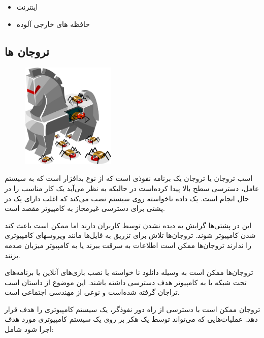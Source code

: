 \documentclass[12pt]{book}
\begin{document}
\begin{itemize}
	\item اینترنت
	\item حافظه های خارجی آلوده
\end{itemize}


\newpage

\subsection{تروجان ها}

\begin{figure}
  \vspace{-20pt}
  \begin{center}
    \includegraphics[width=0.4\textwidth]{./HiRes-923x1030.jpg}
  \end{center}
  \vspace{-20pt}
  \caption{}
  \vspace{-10pt}
\end{figure}


اسب تروجان
 یا تروجان یک برنامه نفوذی است که از نوع بدافزار است که به سیستم عامل، دسترسی سطح بالا پیدا کرده‌است در حالیکه به نظر می‌آید یک کار مناسب را در حال انجام است. یک داده ناخواسته روی سیستم نصب می‌کند که اغلب دارای یک در پشتی برای دسترسی غیرمجاز به کامپیوتر مقصد است.

این در پشتی‌ها گرایش به دیده نشدن توسط کاربران دارند اما ممکن است باعث کند شدن کامپیوتر شوند. تروجان‌ها تلاش برای تزریق به فایل‌ها مانند ویروسهای کامپیوتری را ندارند تروجان‌ها ممکن است اطلاعات به سرقت ببرند یا به کامپیوتر میزبان صدمه بزنند.

تروجان‌ها ممکن است به وسیله دانلود نا خواسته یا نصب بازی‌های آنلاین یا برنامه‌های تحت شبکه یا به کامپیوتر هدف دسترسی داشته باشند. این موضوع از داستان اسب تراجان گرفته شده‌است و نوعی از مهندسی اجتماعی است.


تروجان ممکن است با دسترسی از راه دور نفوذگر، یک سیستم کامپیوتری را هدف قرار دهد. عملیات‌هایی که می‌تواند توسط یک هکر بر روی یک سیستم کامپیوتری مورد هدف اجرا شود شامل: 
\end{document}
